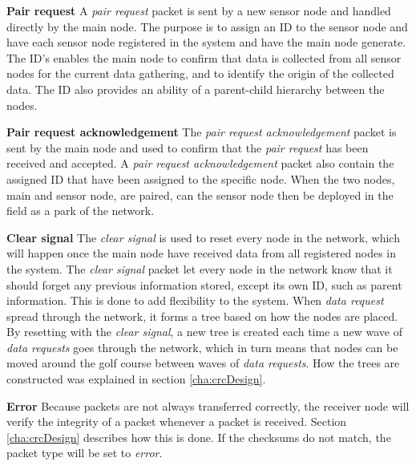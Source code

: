 
\textbf{Pair request}\newline
A \textit{pair request} packet is sent by a new sensor node and handled directly by the main node. The purpose is to assign an ID to the sensor node and have each sensor node registered in the system and have the main node generate. The ID's enables the main node to confirm that data is collected from all sensor nodes for the current data gathering, and to identify the origin of the collected data. The ID also provides an ability of a parent-child hierarchy between the nodes.

\textbf{Pair request acknowledgement}\newline
The \textit{pair request acknowledgement} packet is sent by the main node and used to confirm that the \textit{pair request} has been received and accepted. A \textit{pair request acknowledgement} packet also contain the assigned ID that have been assigned to the specific node. When the two nodes, main and sensor node, are paired, can the sensor node then be deployed in the field as a park of the network. 

\textbf{Clear signal}\newline
The \textit{clear signal} is used to reset every node in the network, which will happen once the main node have received data from all registered nodes in the system.
The \textit{clear signal} packet let every node in the network know that it should forget any previous information stored, except its own ID, such as parent information. This is done to add flexibility to the system. When \textit{data request} spread through the network, it forms a tree based on how the nodes are placed. By resetting with the \textit{clear signal}, a new tree is created each time a new wave of \textit{data requests} goes through the network, which in turn means that nodes can be moved around the golf course between waves of \textit{data requests}. How the trees are constructed was explained in section \ref{cha:crcDesign}.

\textbf{Error}\newline
Because packets are not always transferred correctly, the receiver node will verify the integrity of a packet whenever a packet is received. Section \ref{cha:crcDesign} describes how this is done. If the checksums do not match, the packet type will be set to \textit{error}.

